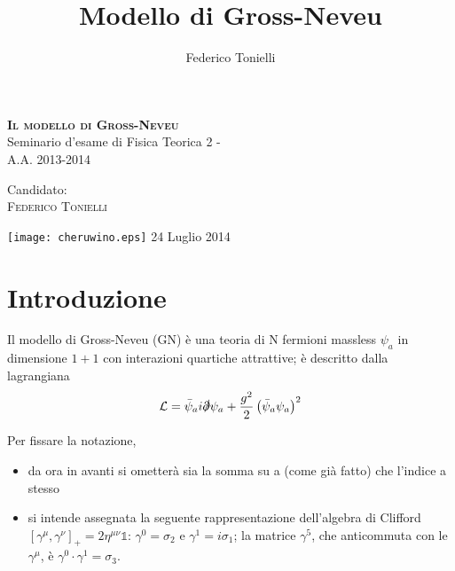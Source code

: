 \documentclass[a4paper,11pt]{amsart}
\title{Modello di Gross-Neveu}
\author{Federico Tonielli}
\newcommand\blankpage{%
    \null
    \thispagestyle{empty}%
    \addtocounter{page}{-1}%
    \newpage}
\newcommand{\nl}{\vskip 0.3cm}
\newcommand{\psibar}{\bar{\psi}}
\newcommand{\ssection}[2]{\section{ \texorpdfstring{\textbf{#1}}{#2} }}
\begin{document}
\begin{titlepage}
  \begin{center}
  \textsc{ \LARGE \textbf{Il modello di Gross-Neveu}  } \\[1 cm]
  \Large{Seminario d'esame di Fisica Teorica 2 - \\
  A.A. 2013-2014}
  \vspace{0.5 cm}
  \\[1.5 cm]
  \begin{flushright} 
  \Large 
  Candidato:\\
  \textsc{Federico Tonielli}
  \end{flushright}
  \vspace{2.5 cm}
  \texttt{[image: cheruwino.eps]}
  \vfill
  {\Large 24 Luglio 2014}
  \end{center}  
\end{titlepage}

\blankpage

\tableofcontents
\blankpage

\blankpage



\ssection{Introduzione}{Introduzione}

Il modello di Gross-Neveu (GN) è una teoria di N fermioni massless $ \psi_a $ in dimensione $1+1$ con interazioni quartiche attrattive; 
è descritto dalla lagrangiana 
\[
 \mathcal{L} = \psibar_a i\slashed{\partial}\psi_a + \frac{g^2}{2}\left(\psibar_a\psi_a\right)^2
\]
\nl

Per fissare la notazione, 
\begin{itemize}
 \item da ora in avanti si ometterà sia la somma su a (come già fatto) che l'indice a stesso
 \item si intende assegnata la seguente rappresentazione dell'algebra di Clifford $[\gamma^{\mu},\gamma^{\nu}]_+ = 2\eta^{\mu\nu}\mathbb{1}$: 
 $\gamma^0 = \sigma_2$ e $\gamma^1 = i\sigma_1$; la matrice $\gamma^5$, che anticommuta con le $\gamma^{\mu}$, è $\gamma^0\cdot\gamma^1 = \sigma_3$.
\end{itemize}
\nl
\end{document}
